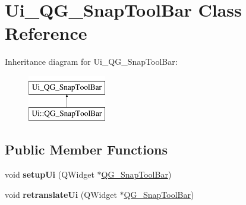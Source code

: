 \hypertarget{classUi__QG__SnapToolBar}{\section{Ui\-\_\-\-Q\-G\-\_\-\-Snap\-Tool\-Bar Class Reference}
\label{classUi__QG__SnapToolBar}
}
Inheritance diagram for Ui\-\_\-\-Q\-G\-\_\-\-Snap\-Tool\-Bar\-:\begin{figure}[H]
\begin{center}
\leavevmode
\includegraphics[height=2.000000cm]{classUi__QG__SnapToolBar}
\end{center}
\end{figure}
\subsection*{Public Member Functions}
\begin{DoxyCompactItemize}
\item 
\hypertarget{classUi__QG__SnapToolBar_ab33de121c21a55b1f0f8677b02055a1a}{void {\bfseries setup\-Ui} (Q\-Widget $\ast$\hyperlink{classQG__SnapToolBar}{Q\-G\-\_\-\-Snap\-Tool\-Bar})}\label{classUi__QG__SnapToolBar_ab33de121c21a55b1f0f8677b02055a1a}

\item 
\hypertarget{classUi__QG__SnapToolBar_a2bbfddbb1132b6dd9da6b1e455e3e1d9}{void {\bfseries retranslate\-Ui} (Q\-Widget $\ast$\hyperlink{classQG__SnapToolBar}{Q\-G\-\_\-\-Snap\-Tool\-Bar})}\label{classUi__QG__SnapToolBar_a2bbfddbb1132b6dd9da6b1e455e3e1d9}

\end{DoxyCompactItemize}
